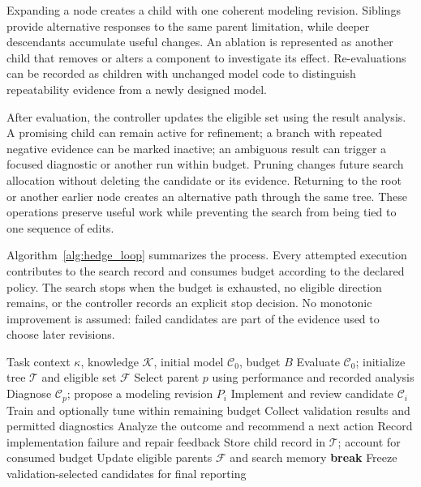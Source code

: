 Expanding a node creates a child with one coherent modeling revision. Siblings provide alternative responses to the same parent limitation, while deeper descendants accumulate useful changes. An ablation is represented as another child that removes or alters a component to investigate its effect. Re-evaluations can be recorded as children with unchanged model code to distinguish repeatability evidence from a newly designed model.

After evaluation, the controller updates the eligible set using the result analysis. A promising child can remain active for refinement; a branch with repeated negative evidence can be marked inactive; an ambiguous result can trigger a focused diagnostic or another run within budget. Pruning changes future search allocation without deleting the candidate or its evidence. Returning to the root or another earlier node creates an alternative path through the same tree. These operations preserve useful work while preventing the search from being tied to one sequence of edits.

Algorithm~\ref{alg:hedge_loop} summarizes the process. Every attempted execution contributes to the search record and consumes budget according to the declared policy. The search stops when the budget is exhausted, no eligible direction remains, or the controller records an explicit stop decision. No monotonic improvement is assumed: failed candidates are part of the evidence used to choose later revisions.

\begin{algorithm}[t]
\caption{Iterative Circuit-Model Search}
\label{alg:hedge_loop}
\begin{algorithmic}[1]
\REQUIRE Task context $\kappa$, knowledge $\mathcal{K}$, initial model $\mathcal{C}_0$, budget $B$
\STATE Evaluate $\mathcal{C}_0$; initialize tree $\mathcal{T}$ and eligible set $\mathcal{F}$
    \STATE Select parent $p$ using performance and recorded analysis
    \STATE Diagnose $\mathcal{C}_p$; propose a modeling revision $P_i$
    \STATE Implement and review candidate $\mathcal{C}_i$
        \STATE Train and optionally tune within remaining budget
        \STATE Collect validation results and permitted diagnostics
        \STATE Analyze the outcome and recommend a next action
    \ELSE
        \STATE Record implementation failure and repair feedback
    \ENDIF
    \STATE Store child record in $\mathcal{T}$; account for consumed budget
    \STATE Update eligible parents $\mathcal{F}$ and search memory
        \STATE \textbf{break}
    \ENDIF
\ENDWHILE
\STATE Freeze validation-selected candidates for final reporting
\end{algorithmic}
\end{algorithm}

